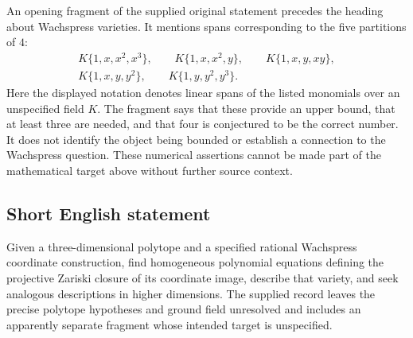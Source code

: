 \documentclass[11pt]{article}
\begin{document}
An opening fragment of the supplied original statement precedes the heading about Wachspress varieties. It mentions spans corresponding to the five partitions of \(4\):
\[
\begin{gathered}
K\{1,x,x^2,x^3\},\qquad K\{1,x,x^2,y\},\qquad
K\{1,x,y,xy\},\\
K\{1,x,y,y^2\},\qquad K\{1,y,y^2,y^3\}.
\end{gathered}
\]
Here the displayed notation denotes linear spans of the listed monomials over an unspecified field \(K\). The fragment says that these provide an upper bound, that at least three are needed, and that four is conjectured to be the correct number. It does not identify the object being bounded or establish a connection to the Wachspress question. These numerical assertions cannot be made part of the mathematical target above without further source context.
\subsection{Short English statement}
Given a three-dimensional polytope and a specified rational Wachspress coordinate construction, find homogeneous polynomial equations defining the projective Zariski closure of its coordinate image, describe that variety, and seek analogous descriptions in higher dimensions. The supplied record leaves the precise polytope hypotheses and ground field unresolved and includes an apparently separate fragment whose intended target is unspecified.
\end{document}

